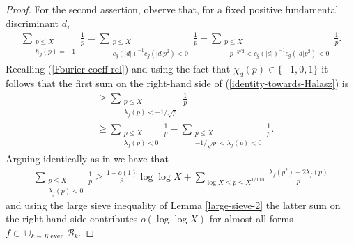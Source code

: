 \documentclass[a4paper,10pt,twoside]{amsart}
\theoremstyle{definition}
\numberwithin{equation}{section}
\renewcommand\:{\colon}
\begin{document}
\begin{proof}
For the second assertion, observe that, for a fixed positive fundamental discriminant $d$, 
\begin{align}\label{identity-towards-Halasz}
\sum_{\substack{p\leq X\\
h_g(p)=-1}}\frac1p=\sum_{\substack{p\leq X\\
c_g(|d|)^{-1}c_g(|d|p^2)<0}}\frac1p-\sum_{\substack{p\leq X\\
-p^{-\eta/2}<c_g(|d|)^{-1}c_g(|d|p^2)<0}}\frac 1p.
\end{align}
Recalling (\ref{Fourier-coeff-rel}) and using the fact that $\chi_d(p)\in\{-1,0,1\}$ it follows that the first sum on the right-hand side of (\ref{identity-towards-Halasz}) is
\begin{align*}
&\geq \sum_{\substack{p\leq X\\
\lambda_f(p)<-1/\sqrt p}}\frac1p \\
&\geq \sum_{\substack{p\leq X\\
\lambda_f(p)<0}}\frac1p-\sum_{\substack{p\leq X\\
-1/\sqrt p<\lambda_f(p)<0}}\frac1p.
\end{align*}
Arguing identically as in \cite[p. 1610]{Lester-Matomaki-Radziwill2018} we have that
\begin{align*}
\sum_{\substack{p\leq X\\
\lambda_f(p)<0}}\frac1p\geq\frac{1+o(1)}8\log\log X+\sum_{\log X\leq p\leq X^{1/1000}}\frac{\lambda_f(p^2)-2\lambda_f(p)}p
\end{align*} 
and using the large sieve inequality of Lemma \ref{large-sieve-2} the latter sum on the right-hand side contributes $o(\log\log X)$ for almost all forms $f\in\cup_{k\sim K\,\text{even}}\mathcal B_k$. 


\end{proof}
\end{document}
